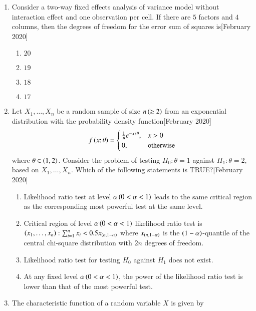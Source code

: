 \documentclass[journal]{IEEEtran}
\begin{document}
\begin{enumerate}
    \item Consider a two-way fixed effects analysis of variance model without interaction effect and one observation per cell. If there are $5$ factors and $4$ columns, then the degrees of freedom for the error sum of squares is\hfill[February 2020]
    \begin{enumerate}
        \item $20$
        \item $19$
        \item $18$
        \item $17$
    \end{enumerate}
    
    \item Let $X_1, \dots, X_n$ be a random sample of size $n\left( \geq 2 \right)$ from an exponential distribution with the probability density function\hfill[February 2020]
    \begin{align}
    f\left(x; \theta\right) = 
    \begin{cases} 
      \frac{1}{\theta} e^{-x/\theta}, & x > 0 \\ 
      0, & \text{otherwise} 
    \end{cases}
    \end{align}
    where $\theta \in \left(1, 2\right)$. Consider the problem of testing $H_0: \theta = 1$ against $H_1: \theta = 2$, based on $X_1, \dots, X_n$. Which of the following statements is TRUE?\hfill[February 2020]
    \begin{enumerate}
        \item Likelihood ratio test at level $\alpha\left(0 < \alpha < 1\right)$ leads to the same critical region as the corresponding most powerful test at the same level.
        \item Critical region of level $\alpha\left(0 < \alpha < 1\right)$ likelihood ratio test is ${\left(x_1, \dots, x_n\right): \sum_{i=1}^n x_i < 0.5 x_{\left(n,1-\alpha\right)}}$ where $x_{\left(n,1-\alpha\right)}$ is the $\left(1 - \alpha\right)$-quantile of the central chi-square distribution with $2n$ degrees of freedom.
        \item Likelihood ratio test for testing $H_0$ against $H_1$ does not exist.
        \item At any fixed level $\alpha\left(0 < \alpha < 1\right)$, the power of the likelihood ratio test is lower than that of the most powerful test.
    \end{enumerate}
     \item The characteristic function of a random variable $X$ is given by

\end{enumerate}
\end{document}

